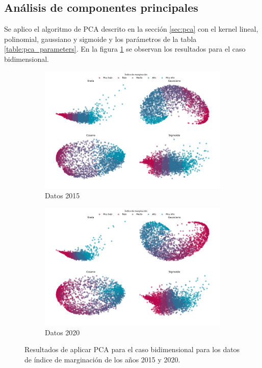 \subsection{Análisis de componentes principales}

Se aplico el algoritmo de PCA descrito en la sección \ref{sec:pca} con el kernel lineal, polinomial, gaussiano y sigmoide y los parámetros de la tabla \ref{table:pca_parameters}. En la figura \ref{fig:PCA_2d} se observan los resultados para el caso bidimensional.

\begin{figure}[H]
    \centering
    \begin{subfigure}{8.4cm}
        \includegraphics[width=1\linewidth]{Graphics/Data_2015/PCA_2D.png}
        \caption{Datos 2015}
    \end{subfigure}
    \begin{subfigure}{8.4cm}
        \includegraphics[width=1\linewidth]{Graphics/Data_2020/PCA_2D.png}
        \caption{Datos 2020}
    \end{subfigure}
    \caption{Resultados de aplicar PCA para el caso bidimensional para los datos de índice de marginación de los años 2015 y 2020.}
    \label{fig:PCA_2d}
\end{figure}

